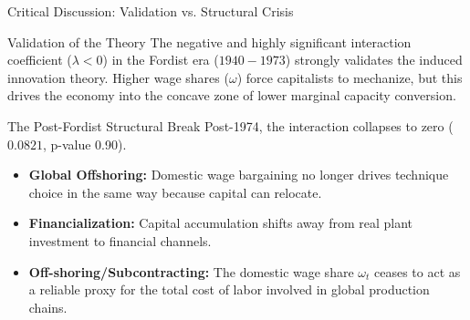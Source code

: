 \documentclass[10pt]{beamer}
\begin{document}
\begin{frame}{Critical Discussion: Validation vs. Structural Crisis}
  \begin{block}{Validation of the Theory}
    The negative and highly significant interaction coefficient ($\lambda < 0$) in the Fordist era ($1940-1973$) strongly validates the induced innovation theory. Higher wage shares ($\omega$) force capitalists to mechanize, but this drives the economy into the concave zone of lower marginal capacity conversion.
  \end{block}
  \begin{block}{The Post-Fordist Structural Break}
    Post-1974, the interaction collapses to zero ($0.0821$, p-value 0.90).
    \begin{itemize}
      \item \textbf{Global Offshoring:} Domestic wage bargaining no longer drives technique choice in the same way because capital can relocate.
      \item \textbf{Financialization:} Capital accumulation shifts away from real plant investment to financial channels.
      \item \textbf{Off-shoring/Subcontracting:} The domestic wage share $\omega_t$ ceases to act as a reliable proxy for the total cost of labor involved in global production chains.
    \end{itemize}
  \end{block}
\end{frame}
\end{document}
